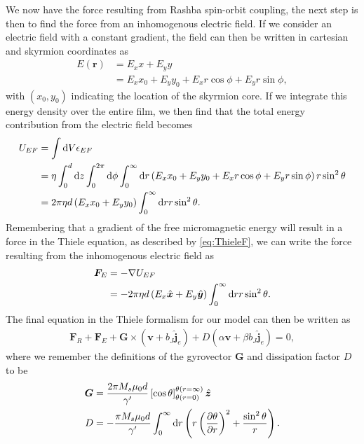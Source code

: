 We now have the force resulting from Rashba spin-orbit coupling, the next step is then to find the force from an inhomogenous electric field. If we consider an electric field with a constant gradient, the field can then be written in cartesian and skyrmion coordinates as
\begin{subequations}
\begin{align}
E(\mathbold{r}) &= E_x x + E_y y \\
&= E_x x_0 + E_y y_0 + E_x r \cos\phi + E_y r \sin\phi,
\end{align}
\end{subequations}
with $\left( x_0,y_0\right)$ indicating the location of the skyrmion core. If we integrate this energy density over the entire film, we then find that the total energy contribution from the electric field becomes
\begin{align}
\nonumber U_{EF} &= \int \operatorname{d}\!{V} \epsilon_{EF} \\
\nonumber &= \eta \int_0^d \operatorname{d}\!{z} \int_0^{2\pi}\operatorname{d}\!{\phi} \int_0^{\infty}\operatorname{d}\!{r}\left( E_x x_0 + E_y y_0 + E_x r \cos\phi + E_y r \sin\phi \right) r \sin^2\theta \\
&= 2\pi\eta d\left(E_x x_0 + E_y y_0\right)\int_0^{\infty}\operatorname{d}\!{r} r \sin^2\theta.
\end{align}
Remembering that a gradient of the free micromagnetic energy will result in a force in the Thiele equation, as described by \eqref{eq:ThieleF}, we can write the force resulting from the inhomogenous electric field as
\begin{align}
\nonumber\mathbold{F}_E &= -\mathbold{\nabla}U_{EF} \\
&= -2\pi \eta d \left(E_x \mathbold{\hat{x}} + E_y \mathbold{\hat{y}}\right) \int_0^{\infty}\d r r \sin^2\theta.
\end{align}
The final equation in the Thiele formalism for our model can then be written as
\begin{align}
\mathbold{F}_R+\mathbold{F}_E + \mathbold{G} \times\left(\mathbold{v}+b_J\mathbold{\hat{j}}_e\right) + D\left(\alpha\mathbold{v}+\beta b_J \mathbold{\hat{j}}_e\right) = 0,
\end{align}
where we remember the definitions of the gyrovector $\mathbold{G}$ and dissipation factor $D$ to be
\begin{subequations}
\begin{align}
\mathbold{G} &= \frac{2\pi M_s\mu_0 d}{\gamma'}\left[\cos\theta\right]_{\theta(r=0)}^{\theta(r=\infty)} \mathbold{\hat{z}}\\
D &= - \frac{\pi M_s \mu_0 d}{\gamma '} \int_0^{\infty} \d r \left(r\left(\frac{\partial \theta}{\partial r}\right)^2+\frac{\sin^2\theta}{r}\right).
\end{align}
\end{subequations}
